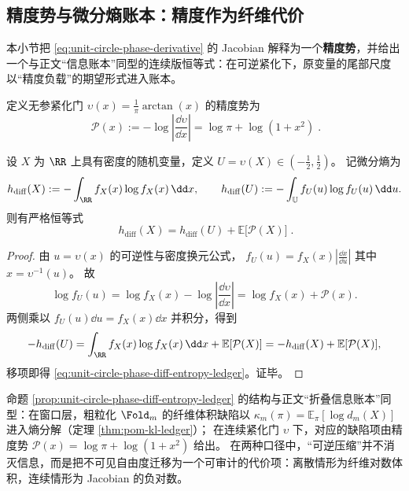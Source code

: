 \subsection{精度势与微分熵账本：精度作为纤维代价}\label{subsec:unit-circle-phase-precision-ledger}
本小节把 \eqref{eq:unit-circle-phase-derivative} 的 Jacobian 解释为一个\textbf{精度势}，并给出一个与正文“信息账本”同型的连续版恒等式：在可逆紧化下，原变量的尾部尺度以“精度负载”的期望形式进入账本。

\begin{definition}[精度势]\label{def:unit-circle-phase-precision-potential}
定义无参紧化门 \(\upsilon(x)=\frac{1}{\pi}\arctan(x)\) 的精度势为
\begin{equation}\label{eq:unit-circle-phase-precision-potential}
\boxed{\;
\mathcal{P}(x):=-\log\left|\frac{\dd \upsilon}{\dd x}\right|
=\log\pi+\log(1+x^2)\; }.
\end{equation}
\end{definition}

\begin{proposition}\label{prop:unit-circle-phase-diff-entropy-ledger}
设 \(X\) 为 \(\RR\) 上具有密度的随机变量，定义 \(U=\upsilon(X)\in(-\tfrac12,\tfrac12)\)。
记微分熵为
\[
h_{\mathrm{diff}}(X):=-\int_{\RR} f_X(x)\log f_X(x)\,\dd x,\qquad
h_{\mathrm{diff}}(U):=-\int_{\mathbb{U}} f_U(u)\log f_U(u)\,\dd u.
\]
则有严格恒等式
\begin{equation}\label{eq:unit-circle-phase-diff-entropy-ledger}
\boxed{\;
h_{\mathrm{diff}}(X)=h_{\mathrm{diff}}(U)+\mathbb{E}\bigl[\mathcal{P}(X)\bigr]\; }.
\end{equation}
\end{proposition}
\begin{proof}
由 \(u=\upsilon(x)\) 的可逆性与密度换元公式，
\(
f_U(u)=f_X(x)\left|\frac{\dd x}{\dd u}\right|
\)
其中 \(x=\upsilon^{-1}(u)\)。
故
\[
\log f_U(u)=\log f_X(x)-\log\left|\frac{\dd \upsilon}{\dd x}\right|
=\log f_X(x)+\mathcal{P}(x).
\]
两侧乘以 \(f_U(u)\dd u=f_X(x)\dd x\) 并积分，得到
\[
-h_{\mathrm{diff}}(U)
=\int_{\RR} f_X(x)\log f_X(x)\,\dd x+\mathbb{E}[\mathcal{P}(X)]
=-h_{\mathrm{diff}}(X)+\mathbb{E}[\mathcal{P}(X)],
\]
移项即得 \eqref{eq:unit-circle-phase-diff-entropy-ledger}。证毕。
\end{proof}

\begin{remark}[与正文信息账本的同型关系]\label{rem:unit-circle-phase-precision-ledger-vs-pom}
命题 \ref{prop:unit-circle-phase-diff-entropy-ledger} 的结构与正文“折叠信息账本”同型：在窗口层，粗粒化 \(\Fold_m\) 的纤维体积缺陷以 \(\kappa_m(\pi)=\mathbb{E}_\pi[\log d_m(X)]\) 进入熵分解（定理 \ref{thm:pom-kl-ledger}）；
在连续紧化门 \(\upsilon\) 下，对应的缺陷项由精度势 \(\mathcal{P}(x)=\log\pi+\log(1+x^2)\) 给出。
在两种口径中，“可逆压缩”并不消灭信息，而是把不可见自由度迁移为一个可审计的代价项：离散情形为纤维对数体积，连续情形为 Jacobian 的负对数。
\end{remark}

